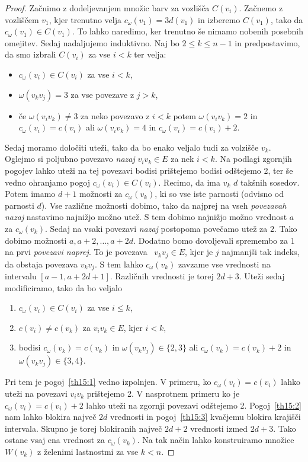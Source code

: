 \documentclass[12pt,a4paper,twoside]{article}
\theoremstyle{definition} %
\theoremstyle{plain} %
\numberwithin{equation}{section}  %
\begin{document}
\begin{proof}
Začnimo z dodeljevanjem množic barv za vozlišča $C(v_i)$. Začnemo z vozliščem $v_1$, kjer trenutno velja $c_{\omega}(v_1) = 3d(v_1)$ in izberemo $C(v_1)$, tako da $c_{\omega}(v_1) \in C(v_1)$. To lahko naredimo, ker trenutno še nimamo nobenih posebnih omejitev. Sedaj nadaljujemo induktivno. Naj bo $ 2 \le k \le n-1$ in predpostavimo, da smo izbrali $C(v_i)$ za vse $i < k$ ter velja:
\begin{itemize}
\item $c_{\omega}(v_i) \in C(v_i)$ za vse $ i < k$,
\item $\omega(v_kv_j) = 3$ za vse povezave z $ j > k$,
\item če $\omega(v_iv_k) \neq 3$ za neko povezavo z $i < k$ potem $\omega(v_iv_k) = 2$ in $c_{\omega}(v_i) = c(v_i)$ ali $\omega(v_iv_k)=4$ in $c_{\omega}(v_i) = c(v_i) + 2$.
\end{itemize}
Sedaj moramo določiti uteži, tako da bo enako veljalo tudi za volzišče $v_k$. Oglejmo si poljubno povezavo \textit{nazaj} $v_iv_k \in E$ za nek $i < k$. Na podlagi zgornjih pogojev lahko uteži na tej povezavi bodisi prištejemo bodisi odštejemo 2, ter še vedno ohranjamo pogoj $c_{\omega}(v_i) \in C(v_i)$. Recimo, da ima $v_k$ $d$ takšnih sosedov. Potem imamo $d+1$ možnosti za $c_{\omega}(v_k)$, ki so vse iste parnosti (odvisno od parnosti $d$). Vse različne možnosti dobimo, tako da najprej na vseh \textit{povezavah nazaj} nastavimo najnižjo možno utež. S tem dobimo najnižjo možno vrednost $a$ za $c_{\omega}(v_k)$. Sedaj na vsaki povezavi \textit{nazaj} postopoma povečamo utež za $2$. Tako dobimo možnosti $a, a+2, \ldots, a +2d$. Dodatno bomo dovoljevali spremembo za $1$ na prvi \textit{povezavi naprej}. To je povezava \ $v_kv_j \in E$, kjer je $j$ najmanjši tak indeks, da obstaja povezava $v_kv_j$. S tem lahko $c_{\omega}(v_k)$ zavzame vse vrednosti na intervalu $[a-1, a + 2d + 1]$. Različnih vrednosti je torej $2d + 3$. Uteži sedaj modificiramo, tako da bo veljalo

\begin{enumerate}
\item \label{th15:1} $c_{\omega}(v_i) \in C(v_i)$ za vse $ i \le k$,
\item \label{th15:2} $c(v_i) \neq c(v_k)$ za $v_iv_k \in E$, kjer $i < k$,
\item \label{th15:3} bodisi $c_{\omega}(v_k) = c(v_k)$ in $\omega(v_kv_j) \in \{2,3\}$ ali $c_{\omega}(v_k) = c(v_k) + 2$ in $\omega(v_kv_j) \in \{3,4\}$.
\end{enumerate}
Pri tem je pogoj~\ref{th15:1} vedno izpolnjen. V primeru, ko $c_{\omega}(v_i) = c(v_i)$ lahko uteži na povezavi $v_iv_k$ prištejemo 2. V nasprotnem primeru ko je $c_{\omega}(v_i) = c(v_i) + 2$ lahko uteži na zgornji povezavi odštejemo 2. Pogoj~\ref{th15:2} nam lahko blokira največ $2d$ vrednosti in pogoj~\ref{th15:3} kvačjemu blokira krajišči intervala. Skupno je torej blokiranih največ $2d+2$ vrednosti izmed $2d+3$. Tako ostane vsaj ena vrednost za $c_{\omega}(v_k)$. Na tak način lahko konstruiramo množice $W(v_k)$ z želenimi lastnostmi za vse $k < n$.


\end{proof}
\end{document}
